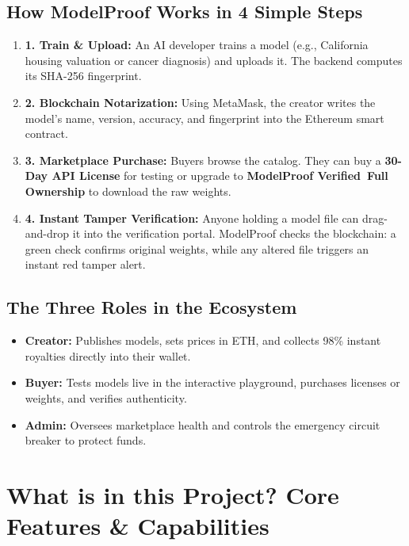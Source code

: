 \documentclass[11pt,a4paper]{article}
\begin{document}
\subsection{How ModelProof Works in 4 Simple Steps}
\begin{enumerate}[leftmargin=1.5em]
    \item \textbf{1. Train \& Upload:} An AI developer trains a model (e.g., California housing valuation or cancer diagnosis) and uploads it. The backend computes its SHA-256 fingerprint.
    \item \textbf{2. Blockchain Notarization:} Using MetaMask, the creator writes the model's name, version, accuracy, and fingerprint into the Ethereum smart contract.
    \item \textbf{3. Marketplace Purchase:} Buyers browse the catalog. They can buy a \textbf{30-Day API License} for testing or upgrade to \textbf{ModelProof Verified\texttrademark\ Full Ownership} to download the raw weights.
    \item \textbf{4. Instant Tamper Verification:} Anyone holding a model file can drag-and-drop it into the verification portal. ModelProof checks the blockchain: a green check confirms original weights, while any altered file triggers an instant red tamper alert.
\end{enumerate}

\subsection{The Three Roles in the Ecosystem}
\begin{itemize}[leftmargin=1.5em]
    \item \textbf{Creator:} Publishes models, sets prices in ETH, and collects 98\% instant royalties directly into their wallet.
    \item \textbf{Buyer:} Tests models live in the interactive playground, purchases licenses or weights, and verifies authenticity.
    \item \textbf{Admin:} Oversees marketplace health and controls the emergency circuit breaker to protect funds.
\end{itemize}

\clearpage

\section{What is in this Project? Core Features \& Capabilities}
\end{document}

